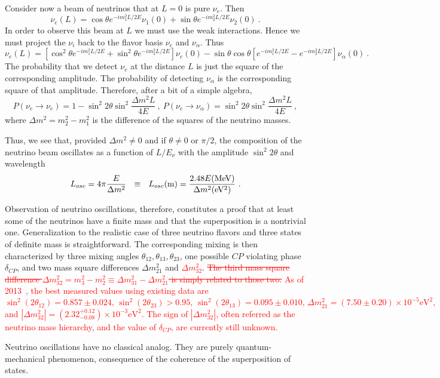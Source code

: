 \documentclass[aps,twocolumn,preprintnumbers,amsmath,superscriptaddress,amssymb,floats,nofootinbib]{revtex4-1}
\begin{document}
{{Consider now a beam of neutrinos that at $L=0$ is pure $\nu_e$. Then
\begin{equation}
\nu_e (L) = \cos \theta e^{-i m_1^2 L/2E} \nu_1(0) + \sin \theta e^{-i m_2^2 L/2E} \nu_2 (0) ~.
\end{equation}
In order to observe this beam at $L$ we must use the weak interactions. Hence we must project the $\nu_i$ back to the flavor basis $\nu_e$ and $\nu_{\alpha}$.
Thus
\begin{equation}
\nu_e (L) = [\cos^2 \theta e^{-i m_1^2 L/2E} + \sin^2 \theta e^{-i m_2^2 L/2E}] \nu_e(0) - 
\sin \theta \cos \theta [e^{-i m_1^2 L/2E} - e^{-i m_2^2 L/2E}] \nu_{\alpha}(0) ~.
\end{equation}
The probability that we detect $\nu_e$ at the distance $L$ is just the square of the corresponding amplitude. The probability
of detecting $\nu_{\alpha}$ is the corresponding square of that amplitude. Therefore, after a bit of a simple algebra,
\begin{equation}\label{eq:osci}
P(\nu_e \rightarrow \nu_e) = 1 - \sin^2 2 \theta \sin^2 \frac{\Delta m^2 L}{4 E} ~,~ P(\nu_e \rightarrow \nu_{\alpha}) =  \sin^2 2 \theta \sin^2 \frac{\Delta m^2 L}{4 E} ~,
\end{equation}
where $\Delta m^2 = m^2_2 - m^2_1$ is the difference of the squares of the neutrino masses. 

Thus, we see that, provided $\Delta m^2 \ne 0$ and if $\theta \ne 0$ or $\pi/2$, the composition of the neutrino beam oscillates as a function of $L/E_{\nu}$ 
with the amplitude $\sin^2 2 \theta$ and wavelength
\begin{equation}
L_{osc} = 4 \pi \frac{E}{\Delta m^2} ~~\equiv ~~ L_{osc} ({\rm m}) = \frac{2.48 E {\rm (MeV)}}{ \Delta m^2 {\rm (eV^2)}} ~. 
\end{equation}

Observation of neutrino oscillations, therefore, constitutes a proof that at least some of the neutrinos have a finite mass and that the superposition is
a nontrivial one. Generalization to the realistic case of three neutrino flavors and three
states of definite mass is straightforward. The corresponding mixing is then characterized by three mixing angles $\theta_{12}, \theta_{13}, \theta_{23}$,
 one possible $CP$ violating phase $\delta_{CP}$,
and two mass square differences $\Delta m^2_{21}$ and  \textcolor{red}{$\Delta m^2_{32}$}. 
\textcolor{red}{\st{The third mass square difference $\Delta m^2_{32} = m^2_3 - m^2_2 \equiv \Delta m^2_{31} - \Delta m^2_{21}$ is simply related to those two.}} 
\textcolor{red}{As of 2013~\cite{PDG14}, the best measured values using existing data are $\sin^2(2\theta_{12}) = 0.857 \pm 0.024, \, \sin^2(2\theta_{23}) > 0.95, \, \sin^2(2\theta_{13}) = 0.095 \pm 0.010, \, \Delta m^2_{21} = (7.50 \pm 0.20) \times 10^{-5} \textrm{eV}^2,  \, $ and $|\Delta m^2_{32}| = (2.32^{+0.12}_{-0.08}) \times 10^{-3} \textrm{eV}^2$. The sign of $|\Delta m^2_{32}|$, often referred as the neutrino mass hierarchy, and the value of $\delta_{CP}$, are currently still unknown.}

Neutrino oscillations have no classical analog. They are purely quantum-mechanical phenomenon, consequence of the coherence of the
superposition of states.

    }%
}
\end{document}
